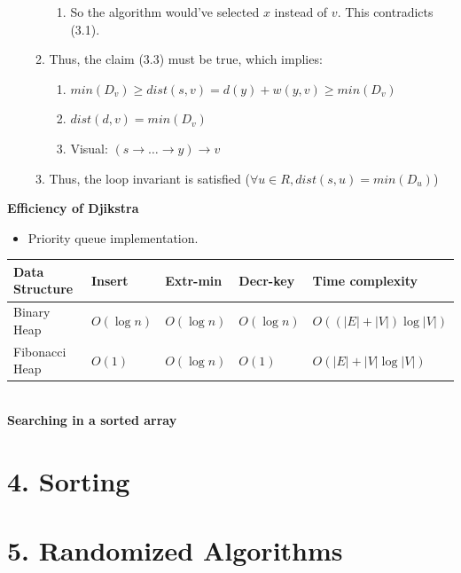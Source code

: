 \documentclass[10pt,landscape]{article}
\begin{document}
\begin{multicols*}{2}
\begin{enumerate}
\begin{enumerate}
\begin{enumerate}
                    \item So the algorithm would've selected $x$ instead of $v$. This contradicts (3.1).
                \end{enumerate}
            \item Thus, the claim (3.3) must be true, which implies:
                \begin{enumerate}
                    \item $min(D_v) \geq dist(s, v) = d(y) + w(y, v) \geq min(D_v)$
                    \item $dist(d, v) = min(D_v)$
                    \item Visual: $(s \rightarrow \dots \rightarrow y) \rightarrow v$
                \end{enumerate}
            \item Thus, the loop invariant is satisfied ($\forall u \in R, dist(s, u) = min(D_u)$)
        \end{enumerate}
\end{enumerate}
\vspace{8pt}
\textbf{Efficiency of Djikstra}
\begin{itemize}
    \item Priority queue implementation.
\end{itemize}

\begin{tabular}{|l|l|l|l|l|}
\hline
Data Structure & Insert & Extr-min & Decr-key & Time complexity \\ \hline
Binary Heap & $O(\log n)$ & $O(\log n)$ & $O(\log n)$ & $O((|E| + |V|) \log |V|)$ \\ \hline
Fibonacci Heap & $O(1)$ & $O(\log n)$ & $O(1)$ & $O(|E| + |V|\log |V|)$ \\ \hline
\end{tabular}
\vspace{8pt} \\
\textbf{Searching in a sorted array} \\
\vspace{8pt}

\hrulefill

\section*{4. Sorting}


\hrulefill

\section*{5. Randomized Algorithms}


\end{multicols*}
\end{document}
